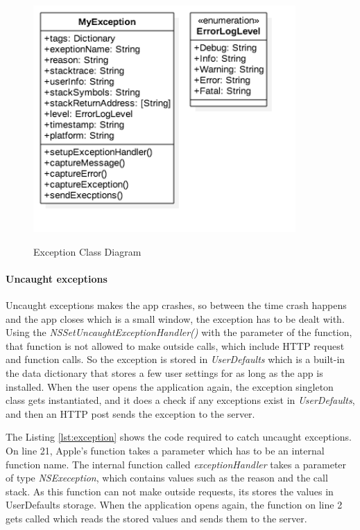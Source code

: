 \begin{figure}[!h]
    \caption{Exception Class Diagram}
    \centering
    \includegraphics[width=100mm]{images/classdiagrams/Exception}
    \label{fig:exception-cd}
\end{figure}

\paragraph{Uncaught exceptions}

Uncaught exceptions makes the app crashes, so between the time crash happens and the app closes which is a small window, the exception has to be dealt with. Using the \textit{NSSetUncaughtExceptionHandler()} with the parameter of the function, that function is not allowed to make outside calls, which include HTTP request and function calls. So the exception is stored in \textit{UserDefaults} which is a built-in the data dictionary that stores a few user settings for as long as the app is installed. When the user opens the application again, the exception singleton class gets instantiated, and it does a check if any exceptions exist in \textit{UserDefaults}, and then an HTTP post sends the exception to the server. 

The Listing \ref{lst:exception} shows the code required to catch uncaught exceptions. On line 21, Apple’s function takes a parameter which has to be an internal function name. The internal function called \textit{exceptionHandler} takes a parameter of type \textit{NSExeception}, which contains values such as the reason and the call stack. As this function can not make outside requests, its stores the values in UserDefaults storage. When the application opens again, the function on line 2 gets called which reads the stored values and sends them to the server.

